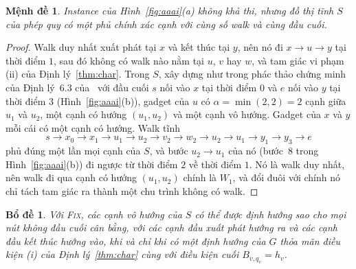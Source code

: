 \documentclass[pdflatex,sn-mathphys-num]{sn-jnl}
\theoremstyle{thmstyleone}
\newtheorem{lemma}[theorem]{Bổ đề}
\newtheorem{proposition}[theorem]{Mệnh đề}
\theoremstyle{thmstyletwo}
\theoremstyle{thmstylethree}
\newcommand{\FIX}{\textup{\textsc{Fix}}}
\begin{document}
\begin{proposition}\label{prop:aaai}
Instance của Hình~\ref{fig:aaai}(a) không khả thi, nhưng đồ thị tĩnh $S$ của phép quy có một phủ chính xác cạnh với cùng số walk và cùng đầu cuối.
\end{proposition}

\begin{proof}
Walk duy nhất xuất phát tại $x$ và kết thúc tại $y$, nên nó đi $x\to u\to y$ tại thời điểm $1$, sau đó không có walk nào nằm tại $u$, $v$ hay $w$, và tam giác vi phạm (ii) của Định lý~\ref{thm:char}. Trong $S$, xây dựng như trong phác thảo chứng minh của Định lý~6.3 của~\cite{deligkas2025} với đầu cuối $s$ nối vào $x$ tại thời điểm $0$ và $e$ nối vào $y$ tại thời điểm $3$ (Hình~\ref{fig:aaai}(b)), gadget của $u$ có $\alpha=\min(2,2)=2$ cạnh giữa $u_1$ và $u_2$, một cạnh có hướng $(u_1,u_2)$ và một cạnh vô hướng. Gadget của $x$ và $y$ mỗi cái có một cạnh có hướng. Walk tĩnh
\[
  s\to x_0\to x_1\to u_1\to u_2\to v_2\to w_2\to u_2\to u_1\to y_1\to y_3\to e
\]
phủ đúng một lần mọi cạnh của $S$, và bước $u_2\to u_1$ của nó (bước~8 trong Hình~\ref{fig:aaai}(b)) đi ngược từ thời điểm $2$ về thời điểm $1$. Nó là walk duy nhất, nên walk đi qua cạnh có hướng $(u_1,u_2)$ chính là $W_1$, và đổi đuôi với chính nó chỉ tách tam giác ra thành một chu trình không có walk.
\end{proof}

\begin{lemma}\label{lem:aaai}
Với \FIX{}, các cạnh vô hướng của $S$ có thể được định hướng sao cho mọi nút không đầu cuối cân bằng, với các cạnh đầu xuất phát hướng ra và các cạnh đầu kết thúc hướng vào, khi và chỉ khi có một định hướng của $G$ thỏa mãn điều kiện (i) của Định lý~\ref{thm:char} cùng với điều kiện cuối $B_{v,q_v}=h_v$.
\end{lemma}
\end{document}
